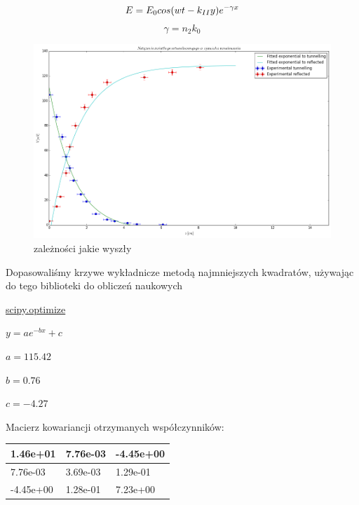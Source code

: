\documentclass[a4paper,12pt]{article}
\begin{document}
$$
E = E_0cos(wt-k_{II}y)e^{-\gamma x} \\
$$
$$
\gamma = n_2k_0
$$
\begin{figure} [H]
  \begin{center}
    \includegraphics[width = 15cm]{prettier_plot.png}
    \caption{zależności jakie wyszły}
  \end{center}
\end{figure}

Dopasowaliśmy krzywe wykładnicze metodą najmniejszych kwadratów, używając do tego biblioteki do obliczeń naukowych 

\href{'http://docs.scipy.org/doc/scipy/reference/tutorial/optimize.html'}{scipy.optimize}


$y = a e^{-bx} + c$

$a = 115.42$

$b = 0.76$

$c = -4.27 $






Macierz kowariancji otrzymanych współczynników:

\begin{center}

    \begin{tabular}{ | m{5cm}| m{5cm} | m{5cm} |} \hline
    
    
    1.46e+01  &   7.76e-03 & -4.45e+00 \\ \hline

 	7.76e-03  & 3.69e-03  & 1.29e-01 \\ \hline
    
    -4.45e+00 &  1.28e-01 &  7.23e+00 \\ \hline
    \end{tabular}
\end{center}
\end{document}
